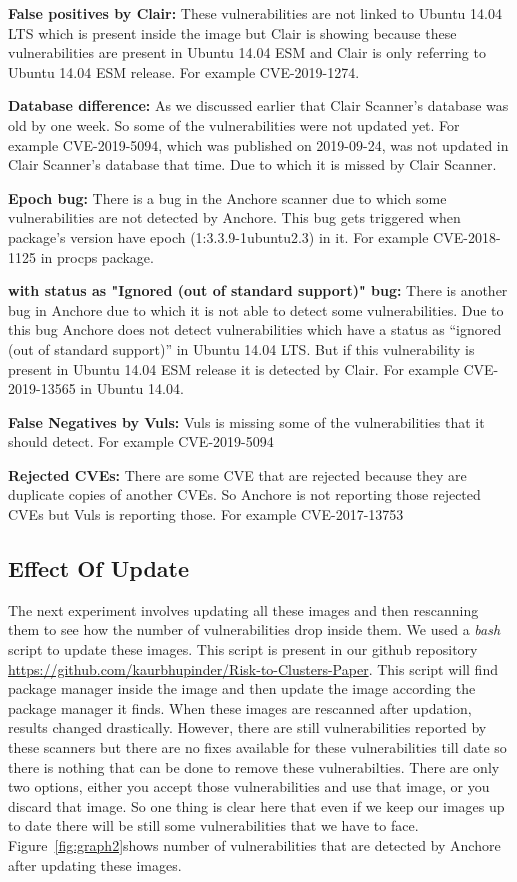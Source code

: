 \documentclass[a4paper,num-refs]{oup-contemporary}
\begin{document}
\begin{Comments}
\textbf{False positives by Clair:} These vulnerabilities are not linked to Ubuntu 14.04 LTS which is 
present inside the image but Clair is showing because these vulnerabilities are present in Ubuntu 14.04 ESM and 
Clair is only referring to Ubuntu 14.04 ESM release. For example CVE-2019-1274.

\textbf{Database difference:} As we discussed earlier that Clair Scanner's database was old by one week.
                So some of the vulnerabilities were not updated yet. For example CVE-2019-5094, which
		was published on 2019-09-24, was not 
		updated in Clair Scanner's database that time. Due to which it is missed by Clair Scanner.

\textbf{Epoch bug:} There is a bug in the Anchore scanner due to which some vulnerabilities are 
		not detected by Anchore. This bug gets triggered when package’s version have epoch 
		(1:3.3.9-1ubuntu2.3)  in it. For example CVE-2018-1125 in procps package.

\textbf{with status as "Ignored (out of standard support)" bug:} There is another bug in Anchore due to 
		which it is not able to detect some vulnerabilities. Due to this bug Anchore does not detect 
		vulnerabilities which have a status as “ignored (out of standard support)” in Ubuntu 14.04 LTS. 
		But if this vulnerability is present in Ubuntu 14.04 ESM release it is detected by Clair. 
		For example CVE-2019-13565 in Ubuntu 14.04.


\textbf{False Negatives by Vuls:} Vuls is missing some of the vulnerabilities that it should detect. 
		For example CVE-2019-5094

\textbf{Rejected CVEs:} There are some CVE that are rejected because they are duplicate copies of another CVEs. 
	So Anchore is not reporting those rejected CVEs but Vuls is reporting those. For example CVE-2017-13753

\subsection{Effect Of Update}

The next experiment involves updating all these images and then rescanning them to see how the number of
vulnerabilities drop inside them. We used a \textit{bash} script to update these images. This script is
present in our github repository \href{https://github.com/kaurbhupinder/Vulnerability-Analysis}
{https://github.com/kaurbhupinder/Risk-to-Clusters-Paper}. This script 
will find package manager inside the image and then update the image according the package manager it finds.
When these images are rescanned after updation, results changed drastically. However, there are still
vulnerabilities reported by these scanners but there are no fixes available for these vulnerabilities
till date so there is nothing that can be done to remove these vulnerabilties. There are only two
options, either you accept those vulnerabilities and use that image, or you discard that image.
So one thing is clear here that even if we keep our images up to date there will be still some
vulnerabilities that we have to face.
Figure~\ref{fig:graph2}shows number of vulnerabilities that are detected by Anchore after updating these images.


\end{Comments}
\end{document}
